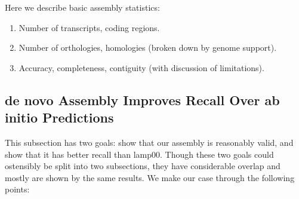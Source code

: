 \documentclass[10pt,twocolumn,linenumbers]{article}
\begin{document}
Here we describe basic assembly statistics:

\begin{enumerate}

\item Number of transcripts, coding regions.
\item Number of orthologies, homologies (broken down by genome support).
\item Accuracy, completeness, contiguity (with discussion of limitations).

\end{enumerate}

\subsection*{de novo Assembly Improves Recall Over ab initio Predictions}

This subsection has two goals: show that our assembly is reasonably valid, and show that it has
better recall than lamp00. Though these two goals could ostensibly be split into two subsections, 
they have considerable overlap and mostly are shown by the same results. We make our case
through the following points:
\end{document}
